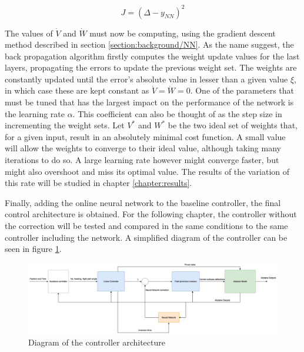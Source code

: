 \begin{equation}
J=(\Delta-y_{NN})^2
\label{eq:NN_cost}
\end{equation}

The values of $\dot{V}$ and $\dot{W}$ must now be computing, using the gradient descent method described in section \ref{section:background/NN}. As the name suggest, the back propagation algorithm firstly computes the weight update values for the last layers, propagating the errors to update the previous weight set. The weights are constantly updated until the error's absolute value in lesser than a given value $\xi$, in which case these are kept constant as $\dot{V}=\dot{W}=0$. 
One of the parameters that must be tuned that has the largest impact on the performance of the network is the learning rate $\alpha$. This coefficient can also be thought of as the step size in incrementing the weight sets. Let $V^*$ and $W^*$ be the two ideal set of weights that, for a given input, result in an absolutely minimal cost function. A small value will allow the weights to converge to their ideal value, although taking many iterations to do so. A large learning rate however might converge faster, but might also overshoot and miss its optimal value. The results of the variation of this rate will be studied in chapter \ref{chapter:results}.

Finally, adding the online neural network to the baseline controller, the final control architecture is obtained. For the following chapter, the controller without the correction will be tested and compared in the same conditions to the same controller including the network. A simplified diagram of the controller can be seen in figure \ref{fig:full_controller}.
\begin{figure}[!htb]
  
  \includegraphics[width=1.1\textwidth]{Figures/full_controller.png}
  \caption[Diagram of the controller architecture]{Diagram of the controller architecture}
  \label{fig:full_controller}
\end{figure}
